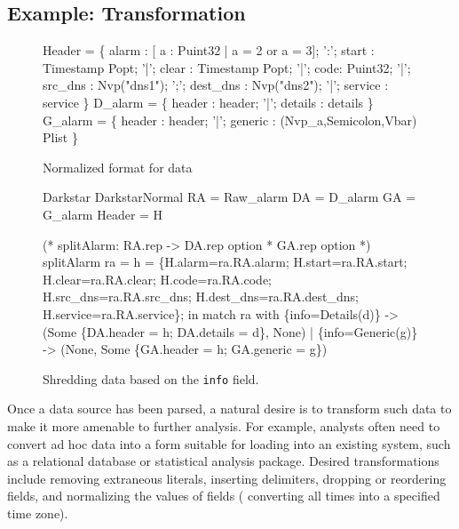 \subsection{Example: Transformation}
\label{sec:ex-trans}

\begin{figure}
  \centering
  \begin{code}\scriptsize
{} Header = \{
       alarm : [ a : Puint32 | a = 2 or a = 3];
 ':';  start :  Timestamp Popt;
 '|';  clear :  Timestamp Popt;
 '|';  code: Puint32;
 '|';  src\_dns  :  Nvp("dns1");
 ';';  dest\_dns :  Nvp("dns2");
 '|';  service  : service
\}
\mbox{}
 D\_alarm = \{
       header   : header;
 '|';  details  : details
 \}
\mbox{}
 G\_alarm = \{
       header   : header;
 '|';  generic  : (Nvp\_a,Semicolon,Vbar) Plist
\}\end{code}
\caption{Normalized format for \darkstar{} data}
\label{fig:normal-darkstar}
\end{figure}

\begin{figure}
\begin{code}\scriptsize
{} Darkstar
 DarkstarNormal
 RA = Raw\_alarm
 DA = D\_alarm
 GA = G\_alarm
 Header = H

(* splitAlarm: RA.rep -> DA.rep option * GA.rep option *)
 splitAlarm ra =
     h = \{H.alarm=ra.RA.alarm; H.start=ra.RA.start; 
              H.clear=ra.RA.clear; H.code=ra.RA.code;
              H.src\_dns=ra.RA.src\_dns; H.dest\_dns=ra.RA.dest\_dns;
              H.service=ra.RA.service\};
    in match ra with
        \{info=Details(d)\} -> 
        (Some \{DA.header = h; DA.details = d\}, None)
      | \{info=Generic(g)\} ->
        (None, Some \{GA.header = h; GA.generic = g\})    
  \end{code}
  \caption{Shredding \darkstar{} data based on the {\tt info} field.}
  \label{fig:ex-no-err-check}
\end{figure}

Once a data source has been parsed, a natural desire is to transform
such data to make it more amenable to further analysis.  For example,
analysts often need to convert ad hoc data into a form suitable for
loading into an existing system, such as a relational database or
statistical analysis package. Desired transformations include
removing extraneous literals, inserting delimiters, dropping or
reordering fields, and normalizing the values of fields (\eg{}
converting all times into a specified time zone).  

